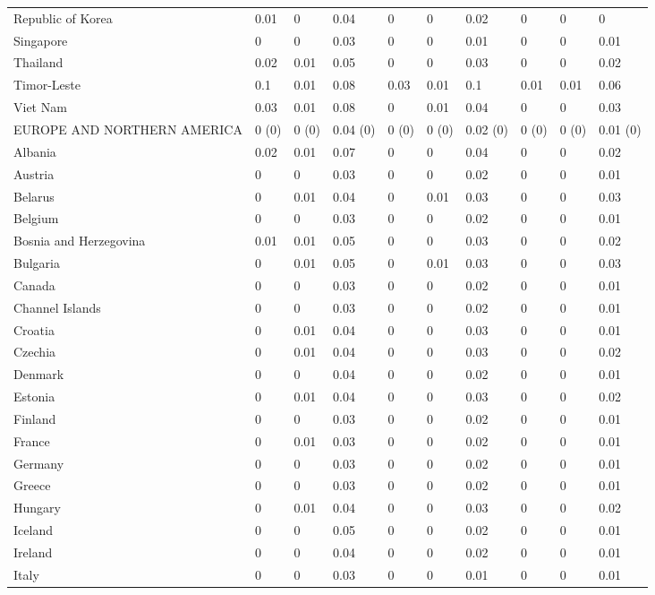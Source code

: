 \begin{longtable}[t]{llllllllll}
Republic of Korea & 0.01 & 0 & 0.04 & 0 & 0 & 0.02 & 0 & 0 & 0\\
Singapore & 0 & 0 & 0.03 & 0 & 0 & 0.01 & 0 & 0 & 0.01\\
Thailand & 0.02 & 0.01 & 0.05 & 0 & 0 & 0.03 & 0 & 0 & 0.02\\
Timor-Leste & 0.1 & 0.01 & 0.08 & 0.03 & 0.01 & 0.1 & 0.01 & 0.01 & 0.06\\
Viet Nam & 0.03 & 0.01 & 0.08 & 0 & 0.01 & 0.04 & 0 & 0 & 0.03\\
EUROPE AND NORTHERN AMERICA & 0 (0) & 0 (0) & 0.04 (0) & 0 (0) & 0 (0) & 0.02 (0) & 0 (0) & 0 (0) & 0.01 (0)\\
Albania & 0.02 & 0.01 & 0.07 & 0 & 0 & 0.04 & 0 & 0 & 0.02\\
Austria & 0 & 0 & 0.03 & 0 & 0 & 0.02 & 0 & 0 & 0.01\\
Belarus & 0 & 0.01 & 0.04 & 0 & 0.01 & 0.03 & 0 & 0 & 0.03\\
Belgium & 0 & 0 & 0.03 & 0 & 0 & 0.02 & 0 & 0 & 0.01\\
Bosnia and Herzegovina & 0.01 & 0.01 & 0.05 & 0 & 0 & 0.03 & 0 & 0 & 0.02\\
Bulgaria & 0 & 0.01 & 0.05 & 0 & 0.01 & 0.03 & 0 & 0 & 0.03\\
Canada & 0 & 0 & 0.03 & 0 & 0 & 0.02 & 0 & 0 & 0.01\\
Channel Islands & 0 & 0 & 0.03 & 0 & 0 & 0.02 & 0 & 0 & 0.01\\
Croatia & 0 & 0.01 & 0.04 & 0 & 0 & 0.03 & 0 & 0 & 0.01\\
Czechia & 0 & 0.01 & 0.04 & 0 & 0 & 0.03 & 0 & 0 & 0.02\\
Denmark & 0 & 0 & 0.04 & 0 & 0 & 0.02 & 0 & 0 & 0.01\\
Estonia & 0 & 0.01 & 0.04 & 0 & 0 & 0.03 & 0 & 0 & 0.02\\
Finland & 0 & 0 & 0.03 & 0 & 0 & 0.02 & 0 & 0 & 0.01\\
France & 0 & 0.01 & 0.03 & 0 & 0 & 0.02 & 0 & 0 & 0.01\\
Germany & 0 & 0 & 0.03 & 0 & 0 & 0.02 & 0 & 0 & 0.01\\
Greece & 0 & 0 & 0.03 & 0 & 0 & 0.02 & 0 & 0 & 0.01\\
Hungary & 0 & 0.01 & 0.04 & 0 & 0 & 0.03 & 0 & 0 & 0.02\\
Iceland & 0 & 0 & 0.05 & 0 & 0 & 0.02 & 0 & 0 & 0.01\\
Ireland & 0 & 0 & 0.04 & 0 & 0 & 0.02 & 0 & 0 & 0.01\\
Italy & 0 & 0 & 0.03 & 0 & 0 & 0.01 & 0 & 0 & 0.01\\

\end{longtable}
